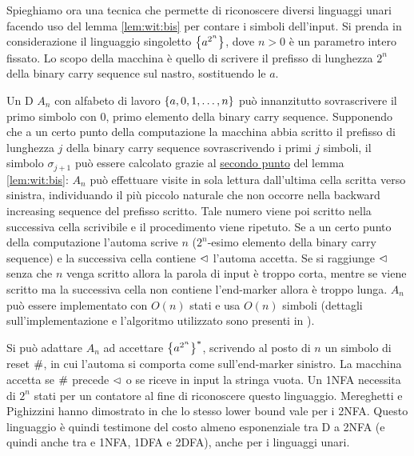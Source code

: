 Spieghiamo ora una tecnica che permette di riconoscere diversi linguaggi unari facendo uso del lemma \ref{lem:wit:bis} per contare i simboli dell'input. Si prenda in considerazione il linguaggio singoletto $\left\{ a^{2^n} \right\}$, dove $n>0$ è un parametro intero fissato. Lo scopo della macchina è quello di scrivere il prefisso di lunghezza $2^n$ della binary carry sequence sul nastro, sostituendo le $a$.

Un D $A_n$ con alfabeto di lavoro $\left\{ a,0,1,\dots,n \right\}$ può innanzitutto sovrascrivere il primo simbolo con $0$, primo elemento della binary carry sequence. Supponendo che a un certo punto della computazione la macchina abbia scritto il prefisso di lunghezza $j$ della binary carry sequence sovrascrivendo i primi $j$ simboli, il simbolo $\sigma_{j+1}$ può essere calcolato grazie al \hyperref[lem:wit:bis:2]{secondo punto} del lemma \ref{lem:wit:bis}: $A_n$ può effettuare visite in sola lettura dall'ultima cella scritta verso sinistra, individuando il più piccolo naturale che non occorre nella backward increasing sequence del prefisso scritto. Tale numero viene poi scritto nella successiva cella scrivibile e il procedimento viene ripetuto. Se a un certo punto della computazione l'automa scrive $n$ ($2^n$-esimo elemento della binary carry sequence) e la successiva cella contiene $\lhd$ l'automa accetta. Se si raggiunge $\lhd$ senza che $n$ venga scritto allora la parola di input è troppo corta, mentre se viene scritto ma la successiva cella non contiene l'end-marker allora è troppo lunga. $A_n$ può essere implementato con $O(n)$ stati e usa $O(n)$ simboli (dettagli sull'implementazione e l'algoritmo utilizzato sono presenti in \cite{Pighizzini:19:limitedunary}).

Si può adattare $A_n$ ad accettare $\left\{ a^{2^n} \right\}^*$, scrivendo al posto di $n$ un simbolo di reset $\#$, in cui l'automa si comporta come sull'end-marker sinistro. La macchina accetta se $\#$ precede $\lhd$ o se riceve in input la stringa vuota. Un 1NFA necessita di $2^n$ stati per un contatore al fine di riconoscere questo linguaggio. Mereghetti e Pighizzini hanno dimostrato in \cite{Mereghetti:00:twoway} che lo stesso lower bound vale per i 2NFA. Questo linguaggio è quindi testimone del costo almeno esponenziale tra D a 2NFA (e quindi anche tra  e 1NFA, 1DFA e 2DFA), anche per i linguaggi unari.

